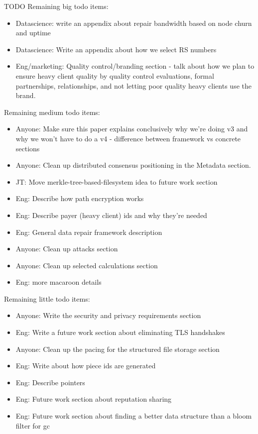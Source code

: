 \documentclass[a4paper,10pt]{article} \usepackage[utf8]{inputenc}
\newcommand{\todo}[1]{{\color{red} TODO #1 }}
\begin{document}
\todo{
Remaining big todo items:
\begin{itemize}
\item Datascience: write an appendix about repair bandwidth based on node
  churn and uptime
\item Datascience: Write an appendix about how we select RS numbers
\item Eng/marketing: Quality control/branding section - talk about how we
  plan to ensure heavy client quality by quality control evaluations, formal
  partnerships, relationships, and not letting poor quality heavy clients
  use the brand.
\end{itemize}

Remaining medium todo items:
\begin{itemize}
\item Anyone: Make sure this paper explains conclusively why we're doing v3 and
  why we won't have to do a v4 - difference between framework vs concrete
  sections
\item Anyone:
  Clean up distributed consensus positioning in the Metadata section.
\item JT: Move merkle-tree-based-filesystem idea to future work section
\item Eng: Describe how path encryption works
\item Eng: Describe payer (heavy client) ids and why they're needed
\item Eng: General data repair framework description
\item Anyone: Clean up attacks section
\item Anyone: Clean up selected calculations section
\item Eng: more macaroon details
\end{itemize}

Remaining little todo items:
\begin{itemize}
\item Anyone: Write the security and privacy requirements section
\item Eng: Write a future work section about eliminating TLS handshakes
\item Anyone: Clean up the pacing for the structured file storage section
\item Eng: Write about how piece ids are generated
\item Eng: Describe pointers
\item Eng: Future work section about reputation sharing
\item Eng: Future work section about finding a better data structure than
 a bloom filter for gc
\end{itemize}
}
\end{document}
